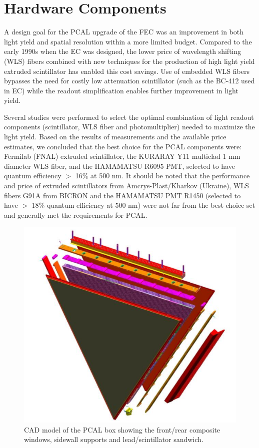 \section{Hardware Components} \label{HW}

A design goal for the PCAL upgrade of the FEC was an improvement in both light yield and spatial resolution within a more limited budget.  Compared to the early 1990s when the EC was designed, the lower price of wavelength shifting (WLS) fibers combined with new techniques for the production of high light yield extruded scintillator has enabled this cost savings.  Use of embedded WLS fibers bypasses the need for costly low attenuation scintillator (such as the BC-412 used in EC) while the readout simplification enables further improvement in light yield.

Several studies were performed \cite{2007002,2007007,2009018} to select the optimal combination of light readout components (scintillator, WLS fiber and photomultiplier) needed to maximize the light yield.  Based on the results of measurements and the available price estimates, we concluded that the best choice for the PCAL components were: Fermilab (FNAL) extruded scintillator, the KURARAY Y11 multiclad 1 mm diameter WLS fiber, and the HAMAMATSU R6095 PMT, selected to have quantum efficiency $>$ 16$\%$ at 500 nm. It should be noted that the performance and price of extruded scintillators from Amcrys-Plast/Kharkov (Ukraine), WLS fibers G91A from BICRON and the HAMAMATSU PMT R1450 (selected to have $>$ 18$\%$ quantum efficiency at 500 nm) were not far from the best choice set and generally met the requirements for PCAL. 

\begin{figure}[hbt]
\centering
\includegraphics[width=0.95\columnwidth,keepaspectratio]{img/S4_0.png}
\caption{CAD model of the PCAL box showing the front/rear composite windows, sidewall supports and lead/scintillator sandwich.}
\label{fig:S4_0}
\end{figure}

